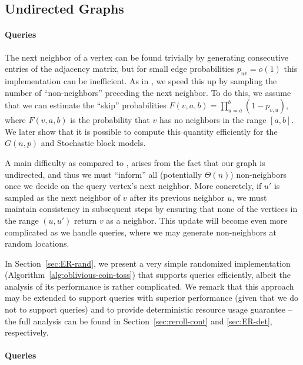 \subsection{Undirected Graphs}
\label{sec:undirected_graphs}

\paragraph*{ Queries}
\label{par:next_neighbor_queries}
The next neighbor of a vertex can be found trivially by generating consecutive entries of the adjacency matrix,
but for small edge probabilities $p_{uv} = o(1)$ this implementation can be inefficient.
As in \cite{reut}, we speed this up by sampling the number of ``non-neighbors'' preceding the next neighbor.
To do this, we assume that we can estimate the ``skip'' probabilities $F(v,a,b)=\prod^{b}_{u=a} (1-p_{v,u})$,
where $F(v,a,b)$ is the probability that $v$ has no neighbors in the range $[a,b]$.
We later show that it is possible to compute this quantity efficiently for the $G(n,p)$ and Stochastic block models.

A main difficulty as compared to \cite{reut}, arises from the fact that our graph is undirected,
and thus we must ``inform'' all (potentially $\Theta(n)$) non-neighbors once we decide on the query vertex's next neighbor.
More concretely, if $u'$ is sampled as the next neighbor of $v$ after its previous neighbor $u$,
we must maintain consistency in subsequent steps by ensuring that none of the vertices in the range $(u,u')$ return $v$ as a neighbor.
This update will become even more complicated as we handle  queries, where we may generate non-neighbors at random locations.

In Section~\ref{sec:ER-rand}, we present a very simple randomized implementation (Algorithm~\ref{alg:oblivious-coin-toss})
that supports  queries efficiently, albeit the analysis of its performance is rather complicated.
We remark that this approach may be extended to support  queries with superior performance
(given that we do not to support  queries) and to provide deterministic resource usage guarantee
-- the full analysis can be found in Section~\ref{sec:reroll-cont} and \ref{sec:ER-det}, respectively.


\paragraph*{ Queries}
\label{par:random_neighbor_queries}

